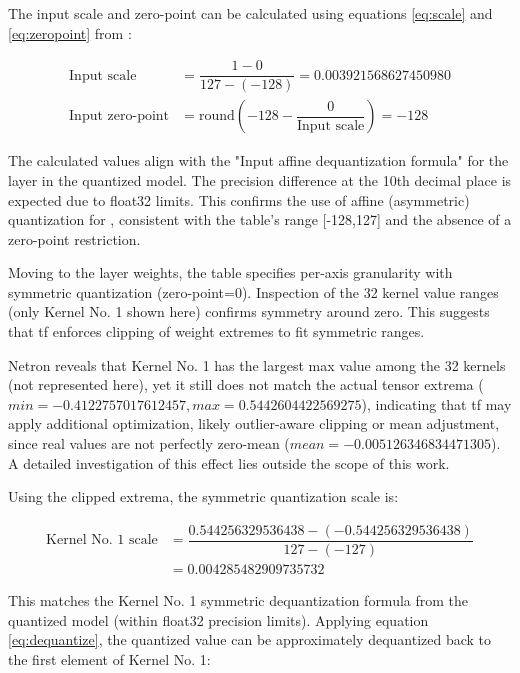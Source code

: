 {The input scale and zero-point can be calculated using equations \ref{eq:scale} and \ref{eq:zeropoint} from :

\[
\begin{array}{rl}
\text{Input scale} &= \dfrac{1 - 0}{127 - (-128)} = 0.003921568627450980 \\[16pt]
\text{Input zero-point} &= \text{round}\!\left(-128 - \dfrac{0}{\text{Input scale}}\right) = -128
\end{array}
\]

The calculated values align with the "Input affine dequantization formula" for the  layer in the quantized model.
The precision difference at the 10th decimal place is expected due to \gls{float32} limits.
This confirms the use of affine (asymmetric) quantization for ,
consistent with the table's range [-128,127] and the absence of a zero-point restriction.

Moving to the  layer weights, the table specifies per-axis granularity with symmetric quantization (zero-point=0).
Inspection of the 32 kernel value ranges (only Kernel No. 1 shown here) confirms symmetry around zero.
This suggests that \gls{tf} enforces clipping of weight extremes to fit symmetric ranges.

Netron reveals that Kernel No. 1 has the largest max value among the 32 kernels (not represented here),
yet it still does not match the actual tensor extrema ($min=-0.4122757017612457, max=0.5442604422569275$),
indicating that \gls{tf} may apply additional optimization, likely outlier-aware clipping or mean adjustment,
since real values are not perfectly zero-mean ($mean=-0.005126346834471305$).
A detailed investigation of this effect lies outside the scope of this work.

Using the clipped extrema, the symmetric quantization scale is:

\[
\begin{array}{rl}
\text{Kernel No. 1 scale} &= \dfrac{0.544256329536438 - (-0.544256329536438)}{127 - (-127)}\\[8pt]
                          &= 0.004285482909735732
\end{array}
\]

This matches the Kernel No. 1 symmetric dequantization formula from the quantized model (within \gls{float32} precision limits).
Applying equation \ref{eq:dequantize}, the quantized value can be approximately dequantized back to the first element of Kernel No. 1:

}
